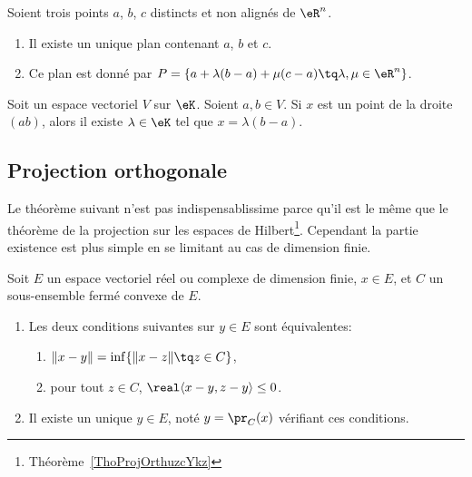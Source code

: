 \begin{proposition}	\label{PROPooTVSZooOJTnnn}
	Soient trois points \( a\), \( b\), \( c\) distincts et non alignés de \( \eR^n\).
	\begin{enumerate}
		\item
		      Il existe un unique plan contenant \( a\), \( b\) et \( c\).
		\item
		      Ce plan est donné par \( P=\{ a+\lambda(b-a)+\mu(c-a)\tq \lambda,\mu\in \eR^n \}\).
	\end{enumerate}
\end{proposition}

\begin{proposition}	\label{PROPooUDLRooShTGmV}
	Soit un espace vectoriel \( V\) sur \( \eK\). Soient \( a,b\in V\). Si \( x\) est un point de la droite \( (ab)\), alors il existe \( \lambda\in \eK\) tel que \( x=\lambda(b-a)\).
\end{proposition}


\subsection{Projection orthogonale}

Le théorème suivant n'est pas indispensablissime parce qu'il est le même que le théorème de la projection sur les espaces de Hilbert\footnote{Théorème~\ref{ThoProjOrthuzcYkz}}. Cependant la partie existence est plus simple en se limitant au cas de dimension finie.
\begin{theoremDef}  \label{ThoWKwosrH}
	Soit \( E\) un espace vectoriel réel ou complexe de dimension finie, \( x\in E\), et \( C\) un sous-ensemble fermé convexe de \(E\).
	\begin{enumerate}
		\item
		      Les deux conditions suivantes sur \( y\in E\) sont équivalentes:
		      \begin{enumerate}
			      \item   \label{zzETsfYCSItemi}
			            \( \| x-y \|=\inf\{ \| x-z \|\tq z\in C \}\),
			            \item\label{zzETsfYCSItemii}
			            pour tout \( z\in C\), \( \real\langle x-y, z-y\rangle \leq 0\).
		      \end{enumerate}
		\item
		      Il existe un unique \( y\in E\), noté \( y=\pr_C(x)\) vérifiant ces conditions.
	\end{enumerate}
\end{theoremDef}

